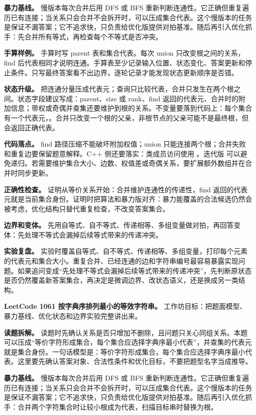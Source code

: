 \textbf{暴力基线。} 慢版本每次合并后用 DFS 或 BFS 重新判断连通性。它正确但重复遍历已有连接；当关系只会合并不会拆开时，可以压成集合代表。这个慢版本的任务是保证不漏答案；它不追求快，只负责给优化版提供对拍基准。随后再引入优化抓手：先合并所有等式，再检查每个不等式是否冲突。

\textbf{手算样例。} 手算时写 parent 表和集合代表。每次 union 只改变根之间的关系，find 后代表相同才说明连通。手算表至少记录输入位置、状态变化、答案更新和停止条件。只写最终答案看不出边界，逐轮记录才能发现状态更新顺序是否错。

\textbf{状态升级。} 把连通分量压成代表元；查询只比较代表，合并只发生在两个根之间。状态字段建议写成：parent、size 或 rank、find 返回的代表元、合并时的附加信息；带权或奇偶并查集还要维护到根的关系。不变量要落到代码上：每个集合有一个代表元，。合并只改变一个根的父亲，非根节点的父亲可能不是最终根，但  会返回正确代表。

\textbf{代码落点。} find 路径压缩不能破坏附加权值；union 只能连接两个根；合并失败和重复边要保留题意解释。C++ 侧还要落实：类成员访问使用 。迭代版  可以避免递归。若需要维护集合大小、边数、权值差或奇偶关系，要扩展额外数组并在合并时同步更新。

\textbf{正确性检查。} 证明从等价关系开始：合并维护连通性的传递性，find 返回的代表元就是当前集合身份。证明时把算法和暴力版对齐：暴力能覆盖的合法候选仍然会被考虑，优化结构只替代重复检查，不改变答案集合。

\textbf{边界和变体。} 先用自等式、自不等式、传递相等、多组变量做对拍，再回答变体：先处理不等式会漏掉后续等式带来的传递冲突。

\textbf{实验复盘。} 实验时覆盖自等式、自不等式、传递相等、多组变量，打印每个元素的代表元和集合大小。重复合并、已经连通的边和字符串编号最容易暴露实现问题。如果追问变成“先处理不等式会漏掉后续等式带来的传递冲突”，先判断原状态是否仍然覆盖新答案集合，再决定是微调边界、改状态语义，还是换成另一类结构。

\noindent\textbf{LeetCode 1061 按字典序排列最小的等效字符串。} 工作坊目标：把题面模型、暴力基线、优化状态和边界实验完整讲出来。

\textbf{读题拆解。} 读题时先确认关系是否只增加不删除，且问题只关心同组关系。本题可以压成“等价字符形成集合，每个集合应选择字典序最小代表”，并查集的代表元就是集合身份。一句话模型是：等价字符形成集合，每个集合应选择字典序最小代表。这里要先确认答案对象、合法性条件和优化目标，不要把题型名字当成推导。

\textbf{暴力基线。} 慢版本每次合并后用 DFS 或 BFS 重新判断连通性。它正确但重复遍历已有连接；当关系只会合并不会拆开时，可以压成集合代表。这个慢版本的任务是保证不漏答案；它不追求快，只负责给优化版提供对拍基准。随后再引入优化抓手：合并两个字符集合时让较小根成为代表，扫描目标串时替换为根。

